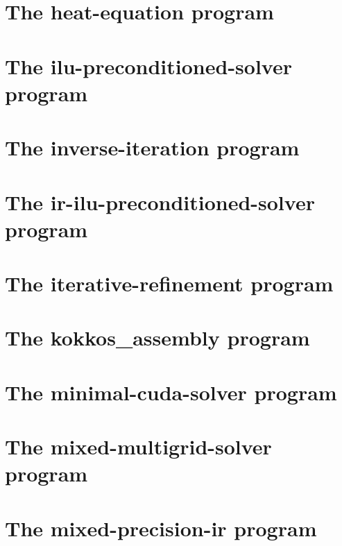 \let\mypdfximage\pdfximage\def\pdfximage{\immediate\mypdfximage}\documentclass[twoside]{book}
\newcommand{\+}{\discretionary{\mbox{\scriptsize$\hookleftarrow$}}{}{}}
\begin{document}
\chapter{The heat-\/equation program}
\label{heat_equation}

\chapter{The ilu-\/preconditioned-\/solver program}
\label{ilu_preconditioned_solver}

\chapter{The inverse-\/iteration program}
\label{inverse_iteration}

\chapter{The ir-\/ilu-\/preconditioned-\/solver program}
\label{ir_ilu_preconditioned_solver}

\chapter{The iterative-\/refinement program}
\label{iterative_refinement}

\chapter{The kokkos\+\_\+assembly program}
\label{kokkos_assembly}

\chapter{The minimal-\/cuda-\/solver program}
\label{minimal_cuda_solver}

\chapter{The mixed-\/multigrid-\/solver program}
\label{mixed_multigrid_solver}

\chapter{The mixed-\/precision-\/ir program}
\label{mixed_precision_ir}

\end{document}
